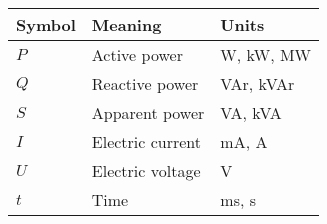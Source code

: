 % 
\begin{longtable}[l]{p{3cm}p{7cm}p{3cm}}
\setlength\tabcolsep{5pt}
\textbf{Symbol} & \textbf{Meaning} & \textbf{Units} \\
\hline
\endhead
\toprule
%
$P$ & Active power & W, kW, MW \\
$Q$ & Reactive power & VAr, kVAr \\
$S$ & Apparent power & VA, kVA \\
$I$ & Electric current & mA, A \\
$U$ & Electric voltage & V \\
$t$ & Time & ms, s \\
%
\end{longtable}